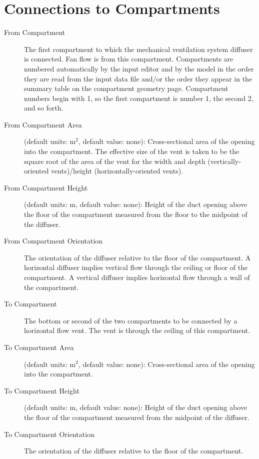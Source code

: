 \section{Connections to Compartments}

\begin{description}
\item[From Compartment] The first compartment to which the mechanical ventilation system diffuser is connected. Fan flow is from this compartment.  Compartments are numbered automatically by the input editor and by the model in the order they are read from the input data file and/or the order they appear in the summary table on the compartment geometry page. Compartment numbers begin with 1, so the first compartment is number 1, the second 2, and so forth.

\item[From Compartment Area] (default units: m$^2$, default value: none): Cross-sectional area of the opening into the compartment. The effective size of the vent is taken to be the square root of the area of the vent for the width and depth (vertically-oriented vents)/height (horizontally-oriented vents).

\item[From Compartment Height] (default units: m, default value: none): Height of the duct opening above the floor of the compartment measured from the floor to the midpoint of the diffuser.

\item[From Compartment Orientation] The orientation of the diffuser relative to the floor of the compartment.  A horizontal diffuser implies vertical flow through the ceiling or floor of the compartment.  A vertical diffuser implies horizontal flow through a wall of the compartment.

\item[To Compartment] The bottom or second of the two compartments to be connected by a horizontal flow vent. The vent is through the ceiling of this compartment.

\item[To Compartment Area] (default units: m$^2$, default value: none): Cross-sectional area of the opening into the compartment.

\item[To Compartment Height] (default units: m, default value: none): Height of the duct opening above the floor of the compartment measured from the midpoint of the diffuser.

\item[To Compartment Orientation] The orientation of the diffuser relative to the floor of the compartment.
\end{description}

